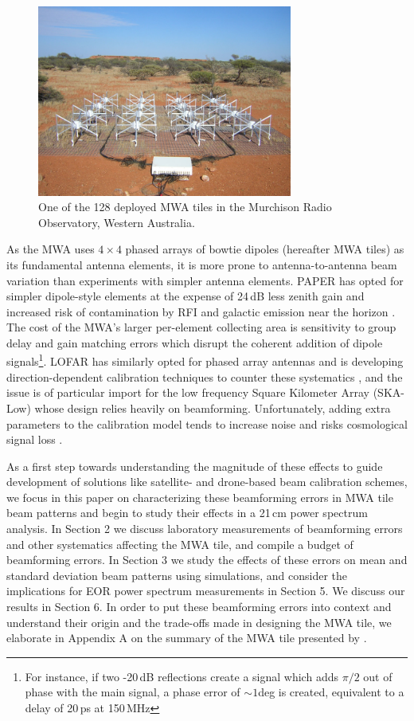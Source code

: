 \begin{figure}
\includegraphics[width=8.38cm]{chap2_beamforming_errors/tile_photo.pdf}
\caption[A deployed MWA tile in the Murchison Radio Observatory.]{One of the 128 deployed MWA tiles in the Murchison Radio Observatory, Western Australia.}
\label{fig:tilephoto}
\end{figure}

As the MWA uses $4\times4$ phased arrays of bowtie dipoles (hereafter MWA tiles) as its fundamental antenna elements, it is more prone to antenna-to-antenna beam variation than experiments with simpler antenna elements. PAPER has opted for simpler dipole-style elements at the expense of 24\,dB less zenith gain and increased risk of contamination by RFI and galactic emission near the horizon \citep{nithya15}. The cost of the MWA's larger per-element collecting area is sensitivity to group delay and gain matching errors which disrupt the coherent addition of dipole signals\footnote{For instance, if two -20\,dB reflections create a signal which adds $\pi/2$ out of phase with the main signal, a phase error of  $\sim1$deg is created, equivalent to a delay of 20\,ps at 150\,MHz}. LOFAR has similarly opted for phased array antennas and is developing direction-dependent calibration techniques to counter these systematics \citep{lofareorpaper}, and the issue is of particular import for the low frequency Square Kilometer Array (SKA-Low) \citep{ska1,ska2,ska3} whose design relies heavily on beamforming. Unfortunately, adding extra parameters to the calibration model tends to increase noise and risks cosmological signal loss \citep[e.g.,][]{gmrtsignalloss}.

As a first step towards understanding the magnitude of these effects to guide development of solutions like satellite- and drone-based beam calibration schemes, we focus in this paper on characterizing these beamforming errors in MWA tile beam patterns and begin to study their effects in a 21\,cm power spectrum analysis. In Section 2 we discuss laboratory measurements of beamforming errors and other systematics affecting the MWA tile, and compile a budget of beamforming errors. In Section 3 we study the effects of these errors on mean and standard deviation beam patterns using simulations, and consider the implications for EOR power spectrum measurements in Section 5. We discuss our results in Section 6. In order to put these beamforming errors into context and understand their origin and the trade-offs made in designing the MWA tile, we elaborate in Appendix A on the summary of the MWA tile presented by \citet{tingay13}.

